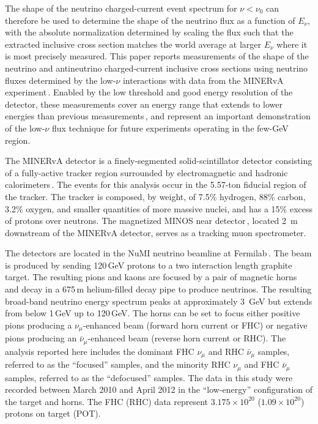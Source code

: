 \documentclass[%
reprint,
% 
superscriptaddress,
showpacs,
preprintnumbers,
showkeys,
nofootinbib,
 amsmath,amssymb,
 aps,
 prd,
floatfix,
]{revtex4-1}
\newcommand\numu     {$\nu_{\mu}$\xspace}
\newcommand\numubar  {$\bar{\nu}_{\mu}$\xspace}
\newcommand\lownu    {low-$\nu$\xspace}
\newcommand\enu      {$E_\nu$\xspace}
\begin{document}
The shape of the neutrino charged-current event spectrum for $\nu<\nu_0$ can therefore be used to determine the shape of the neutrino flux as a function of \enu, with the absolute normalization determined by scaling the flux such that the extracted inclusive cross section matches the world average at larger \enu where it is most precisely measured. This paper reports measurements of the shape of the neutrino and antineutrino charged-current inclusive cross sections using neutrino fluxes determined by the \lownu interactions with data from the MINERvA experiment\,\cite{Josh-thesis}. Enabled by the low threshold and good energy resolution of the detector, these measurements cover an energy range that extends to lower energies than previous measurements\,\cite{PDG}, and represent an important demonstration of the \lownu flux technique for future experiments operating in the few-GeV region. 

The MINERvA detector is a finely-segmented solid-scintillator detector consisting of a fully-active tracker region surrounded by electromagnetic and hadronic calorimeters\,\cite{MINERvA-NIM,DAQ-NIM}. The events for this analysis occur in the 5.57-ton fiducial region of the tracker. The tracker is composed, by weight, of 7.5\% hydrogen, 88\% carbon, 3.2\% oxygen, and smaller quantities of more massive nuclei, and has a 15\% excess of protons over neutrons. The magnetized MINOS near detector\,\cite{MINOS-NIM}, located 2~m downstream of the MINERvA detector, serves as a tracking muon spectrometer. 

The detectors are located in the NuMI neutrino beamline at Fermilab\,\cite{NuMI-NIM}. The beam is produced by sending 120\,GeV protons to a two interaction length graphite target. The resulting pions and kaons are focused by a pair of magnetic horns and decay in a 675\,m helium-filled decay pipe to produce neutrinos. The resulting broad-band neutrino energy spectrum peaks at approximately 3~GeV but extends from below 1\,GeV up to 120\,GeV. The horns can be set to focus either positive pions producing a \numu-enhanced beam (forward horn current or FHC) or negative pions producing an \numubar-enhanced beam (reverse horn current or RHC). The analysis reported here includes the dominant FHC \numu and RHC \numubar samples, referred to as the ``focused'' samples, and the minority RHC \numu and FHC \numubar samples, referred to as the ``defocused'' samples. The data in this study were recorded between March 2010 and April 2012 in the ``low-energy'' configuration of the target and horns. The FHC (RHC) data represent $3.175\times10^{20}$ ($1.09\times10^{20}$) protons on target (POT). 
\end{document}
